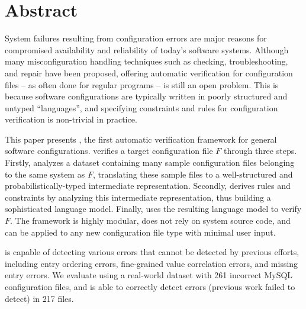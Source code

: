 
\section*{Abstract}

System failures resulting from configuration errors 
are major reasons for compromised availability and
reliability of today's software systems.
Although many misconfiguration handling techniques
such as checking, troubleshooting, and repair
have been proposed, 
offering automatic verification for configuration files -- as often  
done for regular programs -- is still an open problem.
This is because software configurations are typically written in
poorly structured and untyped ``languages'', and 
specifying constraints and rules for configuration 
verification is non-trivial in practice.

This paper presents \app, the first automatic verification framework for
general software configurations.
\app verifies a target configuration file $F$ through three steps.
Firstly, \app analyzes a dataset containing many sample configuration 
files belonging to the same system as $F$,
translating these sample files to a
well-structured and probabilistically-typed 
intermediate representation.
Secondly, \app derives rules and constraints by analyzing
this intermediate representation, thus building a
sophisticated language model.
Finally, \app uses the resulting language model to verify $F$.
The \app framework is highly modular, 
does not rely on system source code, and
can be applied to any new configuration file type with minimal user input. 

\app is capable of detecting various errors that cannot
be detected by previous efforts,
including entry ordering errors, fine-grained value correlation errors, 
and missing entry errors. 
We evaluate \app using a real-world dataset with 261 incorrect 
MySQL configuration files,
and \app is able to correctly 
detect errors (previous work failed to
detect) in 217 files.
